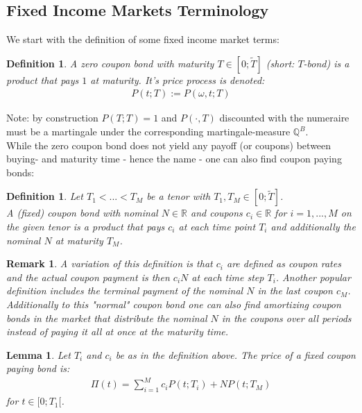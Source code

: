 \documentclass[12pt]{article}
\newtheorem{lemma}[theorem]{Lemma}
\newtheorem{remark}[theorem]{Remark}
\newtheorem{definition}[theorem]{Definition}
\begin{document}
	\subsection{Fixed Income Markets Terminology}
	We start with the definition of some fixed income market terms:
	\begin{definition}
		A \emph{zero coupon bond} with maturity $T \in [0;\tilde{T}]$ (short: $T$-bond) is a product that pays $1$ at maturity. It's price process is denoted:
		\begin{align*}
			P(t;T) := P(\omega,t;T)
		\end{align*}
	\end{definition}
	Note: by construction $P(T;T) = 1$ and $P(\cdot, T)$ discounted with the numeraire must be a martingale under the corresponding martingale-measure $\mathbb{Q}^B$.\\
	While the zero coupon bond does not yield any payoff (or coupons) between buying- and maturity time - hence the name - one can also find coupon paying bonds:
	\begin{definition}
		Let $T_1 < ... < T_M$ be a tenor with $T_1, T_M \in [0;\tilde{T}]$.\\
		A \emph{(fixed) coupon bond} with nominal $N \in \mathbb{R}$ and  coupons $c_i \in \mathbb{R}$ for $i=1, ...,M$ on the given tenor is a product that pays $c_i$ at each time point $T_i$ and additionally the nominal $N$ at maturity $T_M$.
	\end{definition}
	\begin{remark}
		A variation of this definition is that $c_i$ are defined as coupon rates and the actual coupon payment is then $c_i N$ at each time step $T_i$. Another popular definition includes the terminal payment of the nominal $N$ in the last coupon $c_M$. \\
		Additionally to this "normal" coupon bond one can also find \emph{amortizing} coupon bonds in the market that distribute the nominal $N$ in the coupons over all periods instead of paying it all at once at the maturity time.
	\end{remark}
	\begin{lemma}
		Let $T_i$ and $c_i$ be as in the definition above. 
		The price of a fixed coupon paying bond is:
		\begin{align}\label{eq:pricecouponbond}
			\Pi(t)=\sum_{i=1}^{M}c_i P(t;T_i) + NP(t;T_M)
		\end{align}
		for $t\in [0;T_1[$.
	\end{lemma}
\end{document}
